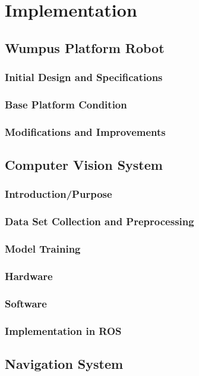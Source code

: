 \chapter{Implementation}
\label{chap:implementation}

\section{Wumpus Platform Robot}
\subsection{Initial Design and Specifications}
\subsection{Base Platform Condition}
\subsection{Modifications and Improvements}

\section{Computer Vision System}
\subsection{Introduction/Purpose}
\subsection{Data Set Collection and Preprocessing}
\subsection{Model Training}
\subsection{Hardware}
\subsection{Software}
\subsection{Implementation in ROS}

\section{Navigation System}
